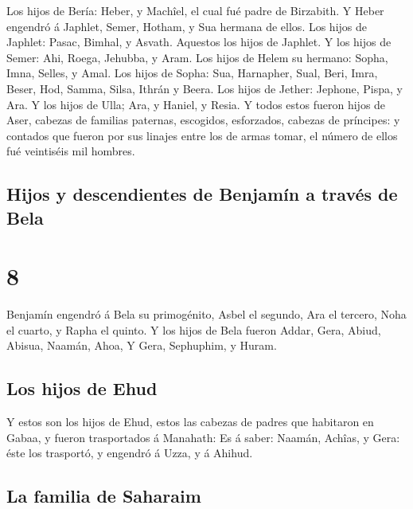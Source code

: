  Los hijos de Bería: Heber, y Machîel, el cual fué padre de
Birzabith.  Y Heber engendró á Japhlet, Semer, Hotham, y
Sua hermana de ellos.  Los hijos de Japhlet: Pasac, Bimhal,
y Asvath. Aquestos los hijos de Japhlet.  Y los hijos de
Semer: Ahi, Roega, Jehubba, y Aram.  Los hijos de Helem su
hermano: Sopha, Imna, Selles, y Amal.  Los hijos de Sopha:
Sua, Harnapher, Sual, Beri, Imra,  Beser, Hod, Samma,
Silsa, Ithrán y Beera.  Los hijos de Jether: Jephone,
Pispa, y Ara.  Y los hijos de Ulla; Ara, y Haniel, y Resia.
 Y todos estos fueron hijos de Aser, cabezas de familias
paternas, escogidos, esforzados, cabezas de príncipes: y contados que
fueron por sus linajes entre los de armas tomar, el número de ellos fué
veintiséis mil hombres.

\hypertarget{hijos-y-descendientes-de-benjamuxedn-a-travuxe9s-de-bela}{%
\subsection{Hijos y descendientes de Benjamín a través de
Bela}\label{hijos-y-descendientes-de-benjamuxedn-a-travuxe9s-de-bela}}

\hypertarget{section-7}{%
\section{8}\label{section-7}}

 Benjamín engendró á Bela su primogénito, Asbel el segundo,
Ara el tercero,  Noha el cuarto, y Rapha el quinto.
 Y los hijos de Bela fueron Addar, Gera, Abiud, 
Abisua, Naamán, Ahoa,  Y Gera, Sephuphim, y Huram.

\hypertarget{los-hijos-de-ehud}{%
\subsection{Los hijos de Ehud}\label{los-hijos-de-ehud}}

 Y estos son los hijos de Ehud, estos las cabezas de padres
que habitaron en Gabaa, y fueron trasportados á Manahath: 
Es á saber: Naamán, Achîas, y Gera: éste los trasportó, y engendró á
Uzza, y á Ahihud.

\hypertarget{la-familia-de-saharaim}{%
\subsection{La familia de Saharaim}\label{la-familia-de-saharaim}}

